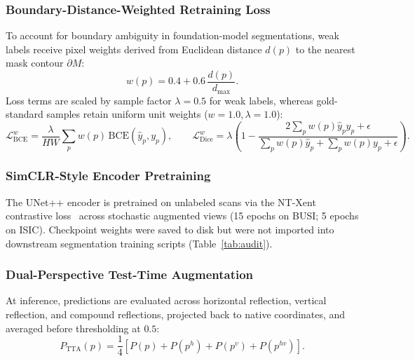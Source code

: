 \documentclass[journal,11pt,onecolumn,draftclsnofoot]{IEEEtran}
\begin{document}
\subsubsection{Boundary-Distance-Weighted Retraining Loss}
To account for boundary ambiguity in foundation-model segmentations, weak labels receive pixel weights derived from Euclidean distance $d(p)$ to the nearest mask contour $\partial M$:
\begin{equation}
w(p) = 0.4 + 0.6\,\frac{d(p)}{d_{\max}}.
\label{eq:dwl}
\end{equation}
Loss terms are scaled by sample factor $\lambda = 0.5$ for weak labels, whereas gold-standard samples retain uniform unit weights ($w=1.0, \lambda=1.0$):
\begin{equation}
\mathcal{L}_{\text{BCE}}^{w} = \frac{\lambda}{HW}\sum_p w(p)\,\mathrm{BCE}(\hat{y}_p, y_p), \qquad
\mathcal{L}_{\text{Dice}}^{w} = \lambda \left( 1 - \frac{2\sum_p w(p)\hat{y}_p y_p + \epsilon}{\sum_p w(p)\hat{y}_p + \sum_p w(p)y_p + \epsilon} \right).
\end{equation}

\subsubsection{SimCLR-Style Encoder Pretraining}
The UNet++ encoder is pretrained on unlabeled scans via the NT-Xent contrastive loss~\cite{chen2020simclr} across stochastic augmented views (15 epochs on BUSI; 5 epochs on ISIC). Checkpoint weights were saved to disk but were not imported into downstream segmentation training scripts (Table~\ref{tab:audit}).

\subsubsection{Dual-Perspective Test-Time Augmentation}
At inference, predictions are evaluated across horizontal reflection, vertical reflection, and compound reflections, projected back to native coordinates, and averaged before thresholding at $0.5$:
\begin{equation}
P_{\text{TTA}}(p) = \frac{1}{4}\left[ P(p) + P(p^h) + P(p^v) + P(p^{hv}) \right].
\label{eq:tta}
\end{equation}
\end{document}
